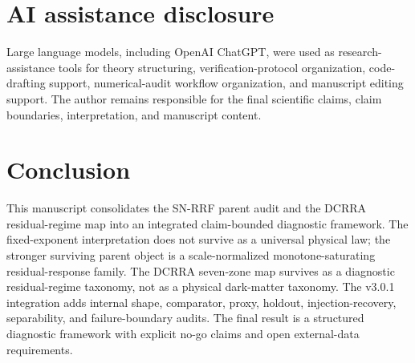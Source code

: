 \documentclass[11pt]{article}
\begin{document}
\section{AI assistance disclosure}
Large language models, including OpenAI ChatGPT, were used as research-assistance tools for theory structuring, verification-protocol organization, code-drafting support, numerical-audit workflow organization, and manuscript editing support. The author remains responsible for the final scientific claims, claim boundaries, interpretation, and manuscript content.

\section{Conclusion}
This manuscript consolidates the SN-RRF parent audit and the DCRRA residual-regime map into an integrated claim-bounded diagnostic framework. The fixed-exponent interpretation does not survive as a universal physical law; the stronger surviving parent object is a scale-normalized monotone-saturating residual-response family. The DCRRA seven-zone map survives as a diagnostic residual-regime taxonomy, not as a physical dark-matter taxonomy. The v3.0.1 integration adds internal shape, comparator, proxy, holdout, injection-recovery, separability, and failure-boundary audits. The final result is a structured diagnostic framework with explicit no-go claims and open external-data requirements.
\end{document}
